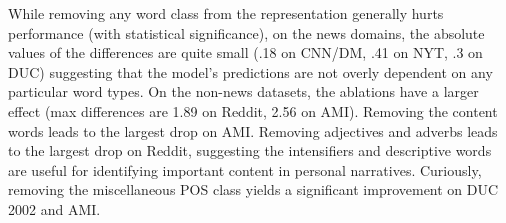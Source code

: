 While removing any word class from the representation generally hurts %
performance (with statistical significance), on the news domains,
the absolute values of the differences are quite small 
(.18 on CNN/DM, .41 on NYT, .3 on DUC) suggesting that the model's predictions
are not overly dependent on any particular word types. 
On the non-news datasets, the ablations have a larger effect 
(max differences are 1.89 on Reddit, 2.56 on AMI). 
Removing the content words leads to the largest drop on AMI.
Removing adjectives and adverbs leads to the largest drop on Reddit,
suggesting the intensifiers and descriptive words are useful for 
identifying important content in personal narratives.
Curiously, 
removing the miscellaneous POS class yields a significant improvement
on DUC 2002 and AMI.




